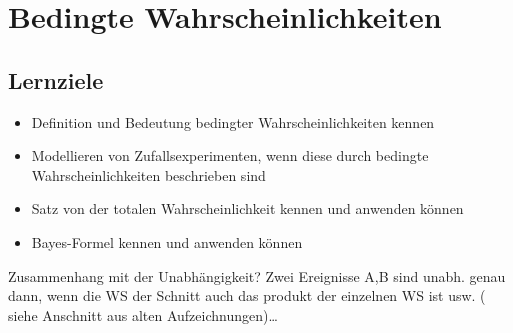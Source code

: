 \chapter{Bedingte Wahrscheinlichkeiten}\label{ch:bedingte-wahrscheinlichkeiten}







\section*{Lernziele}
\begin{itemize}
    \item Definition und Bedeutung bedingter Wahrscheinlichkeiten kennen
    \item Modellieren von Zufallsexperimenten, wenn diese durch bedingte
    Wahrscheinlichkeiten beschrieben sind
    \item Satz von der totalen Wahrscheinlichkeit kennen und anwenden können
    \item Bayes-Formel kennen und anwenden können
\end{itemize}



Zusammenhang mit der Unabhängigkeit?
Zwei Ereignisse A,B sind unabh.
 genau dann, wenn die WS der Schnitt auch das produkt der einzelnen WS ist usw.
(
siehe Anschnitt aus alten Aufzeichnungen)\ldots




